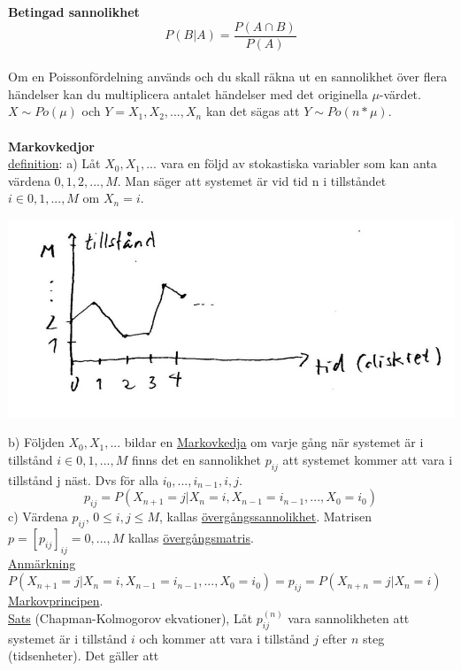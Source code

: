 \documentclass[8pt]{extarticle}
\begin{document}
\begin{multicols*}{2}
\textbf{Betingad sannolikhet}
\begin{equation*}
P(B|A) = \frac{P(A \cap B)}{P(A)}
\end{equation*}
\\
Om en Poissonfördelning används och du skall räkna ut en sannolikhet över flera händelser kan du multiplicera antalet händelser med det originella $\mu$-värdet.\\
$X \sim Po(\mu)$ och $Y = X_1,X_2,...,X_n$ kan det sägas att $Y \sim Po(n * \mu)$.\\
\\
\textbf{Markovkedjor}\\
\underline{definition}: a) Låt $X_0,X_1,...$ vara en följd av stokastiska variabler som kan anta värdena $0,1,2,...,M$. Man säger att systemet är vid tid n i tillståndet $i \in {0,1,...,M}$ om $X_n = i$.
\begin{center}
\includegraphics[width=\linewidth]{markov.png}
\end{center}
b) Följden $X_0,X_1,...$ bildar en \underline{Markovkedja} om varje gång när systemet är i tillstånd $i \in {0,1,...,M}$ finns det en sannolikhet $p_{ij}$ att systemet kommer att vara i tillstånd j näst. Dvs för alla $i_0,...,i_{n-1},i,j$.
\begin{equation*}
p_{ij} = P(X_{n+1} = j | X_n = i, X_{n-1} = i_{n-1}, ..., X_0 = i_0)
\end{equation*}
c) Värdena $p_{ij}$, $0 \leq i , j \leq M$, kallas \underline{övergångssannolikhet}. Matrisen $p = [p_{ij}]_{ij} = 0, ..., M$ kallas \underline{övergångsmatris}.\\
\underline{Anmärkning} $P(X_{n+1} = j | X_n = i, X_{n-1} = i_{n-1}, ... , X_0 = i_0) = p_{ij} = P(X_{n+n} = j | X_n = i)$ \underline{Markovprincipen}.\\
\underline{Sats} (Chapman-Kolmogorov ekvationer), Låt $p_{ij}^{(n)}$ vara sannolikheten att systemet är i tillstånd $i$ och kommer att vara i tillstånd $j$ efter $n$ steg (tidsenheter). Det gäller att

\end{multicols*}
\end{document}
